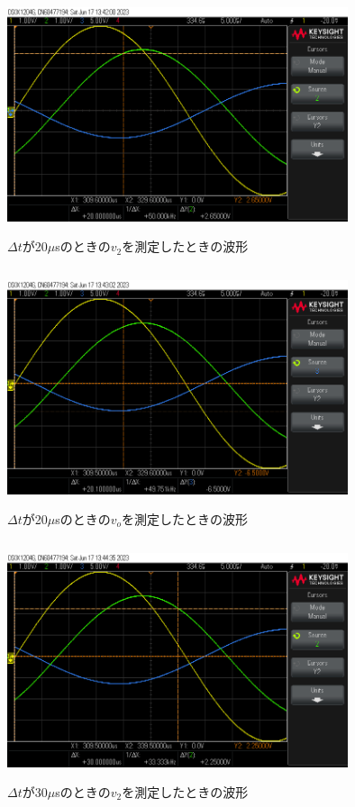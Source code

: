 \documentclass[a4j,10pt,dvipdfmx]{jarticle}
\begin{document}
\begin{figure}[H]
  \begin{center}
  \includegraphics[height=7cm,width=10cm]{20_V2.png}
  \caption{$\Delta t$が20$\mu$sのときの$v_2$を測定したときの波形}
\end{center}
\end{figure}
\begin{figure}[H]
  \begin{center}
  \includegraphics[height=7cm,width=10cm]{20_Vout.png}
  \caption{$\Delta t$が20$\mu$sのときの$v_o$を測定したときの波形}
\end{center}
\end{figure}
\begin{figure}[H]
  \begin{center}
  \includegraphics[height=7cm,width=10cm]{30_V2.png}
  \caption{$\Delta t$が30$\mu$sのときの$v_2$を測定したときの波形}
\end{center}
\end{figure}
\end{document}
